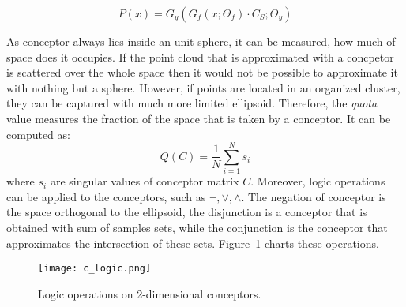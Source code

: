 \documentclass{article}
\begin{document}
\begin{equation*}
  P(x) =  G_{y}( G_{f}( x ; \Theta_{f} ) \cdot C_{S} ; \Theta_{y} )    
\end{equation*}
\par
As conceptor always lies inside an unit sphere, it can be measured, how much of space does it occupies. If the point cloud that is approximated with a concpetor is scattered over the whole space then it would not be possible to approximate it with nothing but a sphere. However, if points are located in an organized cluster, they can be captured with much more limited ellipsoid. Therefore, the \textit{quota} value measures the fraction of the space that is taken by a conceptor. It can be computed as:
\begin{equation*}
    Q(C) = \frac{1}{N} \sum_{i=1}^{N}{s_{i}}
\end{equation*}
where $s_{i}$ are singular values of conceptor matrix $C$. Moreover, logic operations  can be applied to the conceptors, such as $\neg, \vee, \wedge$. The negation of conceptor is the space orthogonal to the ellipsoid, the disjunction is a conceptor that is obtained with sum of samples sets, while the conjunction is the conceptor that approximates the intersection of these sets. Figure~\ref{fig:conceptor_logic} charts these operations.
\begin{figure}%
    \centering
    \texttt{[image: c\_logic.png]}%
    \caption{Logic operations on 2-dimensional conceptors.}
    \label{fig:conceptor_logic}%
\end{figure}
\par
\end{document}
